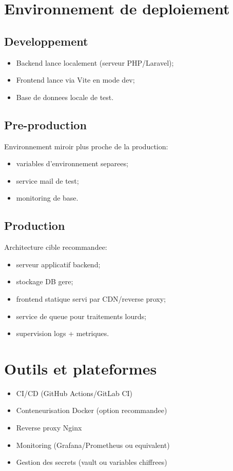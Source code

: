 \documentclass[12pt,a4paper,oneside]{report}
\begin{document}
\section{Environnement de deploiement}
\subsection{Developpement}
\begin{itemize}[leftmargin=1.2cm]
  \item Backend lance localement (serveur PHP/Laravel);
  \item Frontend lance via Vite en mode dev;
  \item Base de donnees locale de test.
\end{itemize}

\subsection{Pre-production}
Environnement miroir plus proche de la production:
\begin{itemize}[leftmargin=1.2cm]
  \item variables d'environnement separees;
  \item service mail de test;
  \item monitoring de base.
\end{itemize}

\subsection{Production}
Architecture cible recommandee:
\begin{itemize}[leftmargin=1.2cm]
  \item serveur applicatif backend;
  \item stockage DB gere;
  \item frontend statique servi par CDN/reverse proxy;
  \item service de queue pour traitements lourds;
  \item supervision logs + metriques.
\end{itemize}

\section{Outils et plateformes}
\begin{itemize}[leftmargin=1.2cm]
  \item CI/CD (GitHub Actions/GitLab CI)
  \item Conteneurisation Docker (option recommandee)
  \item Reverse proxy Nginx
  \item Monitoring (Grafana/Prometheus ou equivalent)
  \item Gestion des secrets (vault ou variables chiffrees)
\end{itemize}
\end{document}
